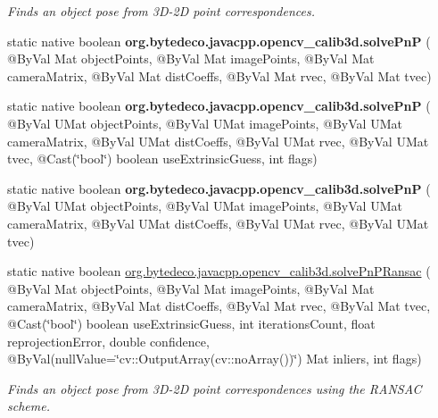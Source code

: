 \begin{DoxyCompactItemize}
\begin{DoxyCompactList}\small\item\em Finds an object pose from 3\+D-\/2D point correspondences. \end{DoxyCompactList}\item 
\mbox{\label{group__calib3d_ga859d6d889e1c94ef3f63405d0e350c2e}} 
static native boolean {\bfseries org.\+bytedeco.\+javacpp.\+opencv\+\_\+calib3d.\+solve\+PnP} ( @By\+Val Mat object\+Points, @By\+Val Mat image\+Points, @By\+Val Mat camera\+Matrix, @By\+Val Mat dist\+Coeffs, @By\+Val Mat rvec, @By\+Val Mat tvec)
\item 
\mbox{\label{group__calib3d_ga40c22e7cd7fa04fc7cb6a6e49515df78}} 
static native boolean {\bfseries org.\+bytedeco.\+javacpp.\+opencv\+\_\+calib3d.\+solve\+PnP} ( @By\+Val U\+Mat object\+Points, @By\+Val U\+Mat image\+Points, @By\+Val U\+Mat camera\+Matrix, @By\+Val U\+Mat dist\+Coeffs, @By\+Val U\+Mat rvec, @By\+Val U\+Mat tvec, @Cast(\char`\"{}bool\char`\"{}) boolean use\+Extrinsic\+Guess, int flags)
\item 
\mbox{\label{group__calib3d_gaa571b33a3b20878743fa6ce62931708e}} 
static native boolean {\bfseries org.\+bytedeco.\+javacpp.\+opencv\+\_\+calib3d.\+solve\+PnP} ( @By\+Val U\+Mat object\+Points, @By\+Val U\+Mat image\+Points, @By\+Val U\+Mat camera\+Matrix, @By\+Val U\+Mat dist\+Coeffs, @By\+Val U\+Mat rvec, @By\+Val U\+Mat tvec)
\item 
static native boolean \hyperlink{group__calib3d_ga87d56bc65d398f58897fa9bda35caef7}{org.\+bytedeco.\+javacpp.\+opencv\+\_\+calib3d.\+solve\+Pn\+P\+Ransac} ( @By\+Val Mat object\+Points, @By\+Val Mat image\+Points, @By\+Val Mat camera\+Matrix, @By\+Val Mat dist\+Coeffs, @By\+Val Mat rvec, @By\+Val Mat tvec, @Cast(\char`\"{}bool\char`\"{}) boolean use\+Extrinsic\+Guess, int iterations\+Count, float reprojection\+Error, double confidence, @By\+Val(null\+Value=\char`\"{}cv\+::\+Output\+Array(cv\+::no\+Array())\char`\"{}) Mat inliers, int flags)
\begin{DoxyCompactList}\small\item\em Finds an object pose from 3\+D-\/2D point correspondences using the R\+A\+N\+S\+AC scheme. \end{DoxyCompactList}\item 
\mbox{\label{group__calib3d_ga7c293d35528196e2ca4619304e6d0d62}} 

\end{DoxyCompactItemize}
